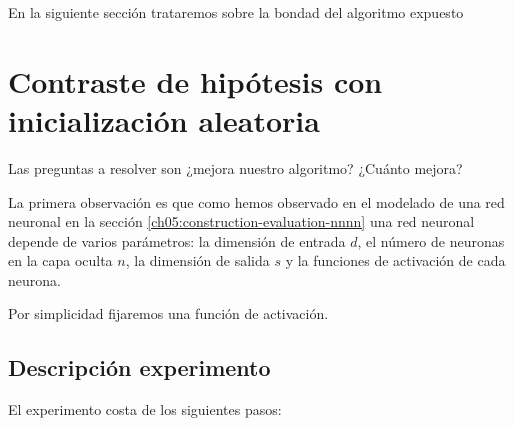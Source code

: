 
En la siguiente sección trataremos sobre la bondad del algoritmo expuesto

\section{Contraste de hipótesis con inicialización aleatoria} 
\label{ch07:experimento-1} 

Las preguntas a resolver son ¿mejora nuestro algoritmo? ¿Cuánto mejora?

La primera observación  es que como
hemos observado en el modelado de una red neuronal 
en la sección \ref{ch05:construction-evaluation-nnnn}
una red neuronal depende de varios parámetros:
la dimensión de entrada $d$, el número de neuronas en la capa oculta $n$, la dimensión de salida $s$ 
y la funciones de activación de cada neurona.  

Por simplicidad fijaremos una función de activación. 


\subsection{Descripción experimento}

El experimento costa de los siguientes pasos: 

